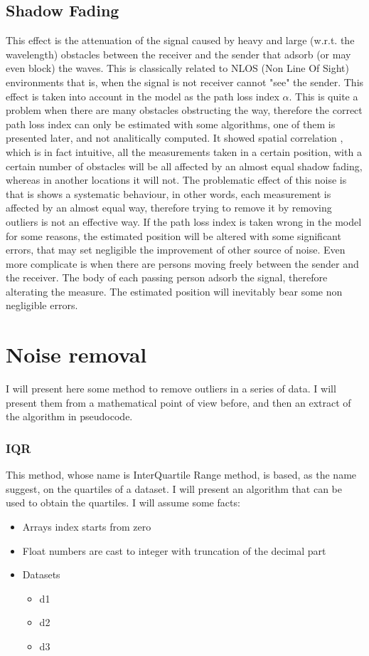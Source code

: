 \documentclass[12pt,twoside]{report}
\begin{document}
\section{Shadow Fading}
This effect is the attenuation of the signal caused by heavy and large (w.r.t. the wavelength) obstacles between the receiver and the sender that adsorb (or may even block) the waves. This is classically related to NLOS (Non Line Of Sight) environments that is, when the signal is not receiver cannot "see" the sender. This effect is taken into account in the model as the path loss index $\alpha$. This is quite a problem when there are many obstacles obstructing the way, therefore the correct path loss index can only be estimated with some algorithms, one of them is presented later, and not analitically computed. It showed spatial correlation \cite{244122,732812}, which is in fact intuitive, all the measurements taken in a certain position, with a certain number of obstacles will be all affected by an almost equal shadow fading, whereas in another locations it will not. The problematic effect of this noise is that is shows a systematic behaviour, in other words, each measurement is affected by an almost equal way, therefore trying to remove it by removing outliers is not an effective way. If the path loss index is taken wrong in the model for some reasons, the estimated position will be altered with some significant errors, that may set negligible the improvement of other source of noise. Even more complicate is when there are persons moving freely between the sender and the receiver. The body of each passing person adsorb the signal, therefore alterating the measure. The estimated position will inevitably bear some non negligible errors.

\chapter{Noise removal}
I will present here some method to remove outliers in a series of data. I will present them from a mathematical point of view before, and then an extract of the algorithm in pseudocode.
\subsection{IQR}
This method, whose name is InterQuartile Range method, is based, as the name suggest, on the quartiles of a dataset. I will present an algorithm that can be used to obtain the quartiles. I will assume some facts:
\begin{itemize}
    \item Arrays index starts from zero
    \item Float numbers are cast to integer with truncation of the decimal part
    \item Datasets
    \begin{itemize}
        \item d1
        \item d2
        \item d3
    \end{itemize}
\end{itemize}
\end{document}
